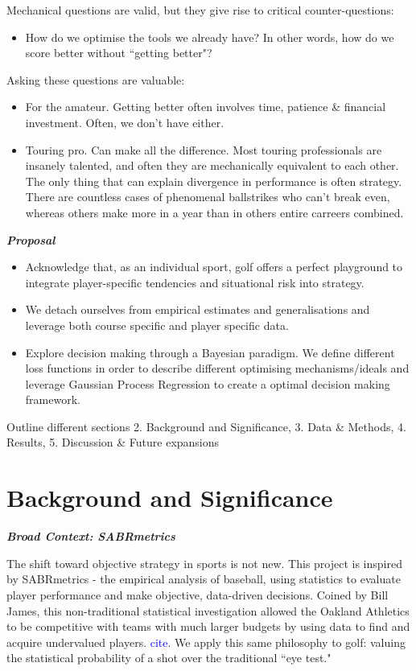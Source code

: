 \documentclass[11pt, letterpaper]{article}
\begin{document}
 Mechanical questions are valid, but they give rise to critical counter-questions:
\begin{itemize}
    \item How do we optimise the tools we already have? In other words, how do we score better without ``getting better"? 
\end{itemize}
Asking these questions are valuable:
\begin{itemize}
    \item For the amateur. Getting better often involves time, patience \& financial investment. Often, we don't have either.
    \item Touring pro. Can make all the difference. Most touring professionals are insanely talented, and often they are mechanically equivalent to each other. The only thing that can explain divergence in performance is often strategy. There are countless cases of phenomenal ballstrikes who can't break even, whereas others make more in a year than in others entire carreers combined.
\end{itemize}

\textbf{\emph{Proposal}}
\begin{itemize}
    \item Acknowledge that, as an individual sport, golf offers a perfect playground to integrate player-specific tendencies and situational risk into strategy. 
    \item We detach ourselves from empirical estimates and generalisations and leverage both course specific and player specific data.
    \item Explore decision making through a Bayesian paradigm. We define different loss functions in order to describe different optimising mechanisms/ideals and leverage Gaussian Process Regression to create a optimal decision making framework. 
\end{itemize}

Outline different sections 2. Background and Significance, 3. Data \& Methods, 4. Results, 5. Discussion \& Future expansions


\section{Background and Significance}

\textbf{\emph{Broad Context: SABRmetrics}}

The shift toward objective strategy in sports is not new. 
This project is inspired by SABRmetrics - the empirical analysis of baseball, using statistics to evaluate player performance and make objective, data-driven decisions. Coined by Bill James, this non-traditional statistical investigation allowed the Oakland Athletics to be competitive with teams with much larger budgets by using data to find and acquire undervalued players. \textcolor{blue}{cite}. We apply this same philosophy to golf: valuing the statistical probability of a shot over the traditional ``eye test."
\end{document}
